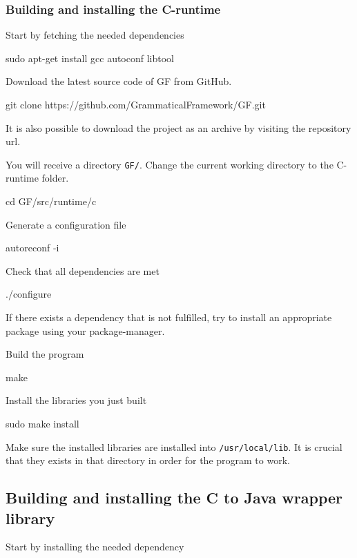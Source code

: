 \subsubsection{Building and installing the C-runtime}
Start by fetching the needed dependencies

\begin{terminal}
sudo apt-get install gcc autoconf libtool
\end{terminal}

Download the latest source code of GF from GitHub.

\begin{terminal}
git clone https://github.com/GrammaticalFramework/GF.git
\end{terminal}

It is also possible to download the project as an archive by visiting the repository url.

You will receive a directory \texttt{GF/}. Change the current working directory to the C-runtime folder.

\begin{terminal}
cd GF/src/runtime/c
\end{terminal}

Generate a configuration file

\begin{terminal}
autoreconf -i
\end{terminal}

Check that all dependencies are met

\begin{terminal}
./configure
\end{terminal}

If there exists a dependency that is not fulfilled, try to install an appropriate package using your package-manager.

Build the program

\begin{terminal}
make
\end{terminal}

Install the libraries you just built

\begin{terminal}
sudo make install
\end{terminal}

Make sure the installed libraries are installed into \texttt{/usr/local/lib}. It is crucial that they exists in that directory in order for the program to work.

\subsection{Building and installing the C to Java wrapper library}
Start by installing the needed dependency

